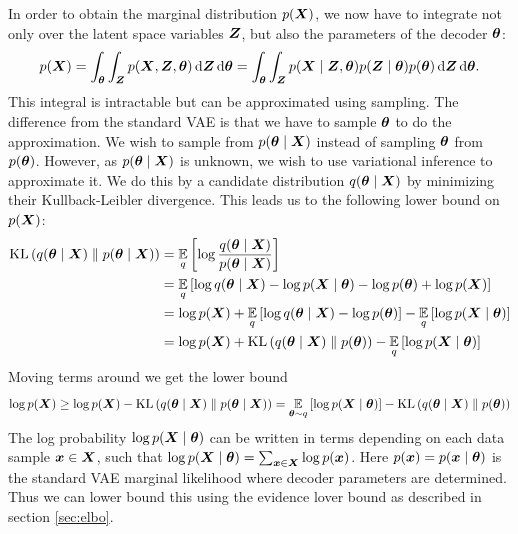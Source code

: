 In order to obtain the marginal distribution $\pX$, we now have to integrate not only over the latent space variables $\ve{Z}$, but also the parameters of the decoder $\ve{\theta}$:
\begin{equation}
    \pX = \int_{\ve{\theta}}\int_{\ve{Z}} p\prts{\ve{X}, \ve{Z}, \ve{\theta}} \diff \ve{Z} \diff \ve{\theta} = \int_{\ve{\theta}}\int_{\ve{Z}} p\prts{\ve{X} \mid \ve{Z}, \ve{\theta}} p(\ve{Z} \mid \ve{\theta}) p(\ve{\theta}) \diff \ve{Z} \diff \ve{\theta}.\label{bayes_px}
\end{equation}
This integral is intractable but can be approximated using sampling.
The difference from the standard VAE is that we have to sample $\ve{\theta}$ to do the approximation. We wish to sample from $\pthetaX$ instead of sampling $\ve{\theta}$  from $\ptheta$. However, as $\pthetaX$ is unknown, we wish to use variational inference to approximate it. We do this by a candidate distribution $\qthetaX$ by minimizing their Kullback-Leibler divergence. This leads us to the following lower bound on $\pX$:
\begin{align*}
    \kl{\qthetaX}{\pthetaX} &= \expectedvalue_q\brts{\log \frac{\qthetaX}{\pthetaX}}\\
    &= \expectedvalue_q\brts{\log \qthetaX - \log \pXtheta - \log \ptheta + \log \pX}\\
    &= \log \pX + \expectedvalue_q\brts{\log \qthetaX - \log \ptheta} - \expectedvalue_q\brts{\log \pXtheta}\\
    &= \log \pX + \kl{\qthetaX}{\ptheta} - \expectedvalue_q\brts{\log \pXtheta}
\end{align*}
Moving terms around we get the lower bound
\[\log \pX \geq \log \pX - \kl{\qthetaX}{\pthetaX} = \expectedvalue_{\ve{\theta} \sim q}\brts{\log \pXtheta} - \kl{\qthetaX}{\ptheta}\]
The log probability $\log \pXtheta$ can be written in terms depending on each data sample $\ve{x} \in \ve{X}$, such that $\log \pXtheta = \sum_{\ve{x} \in \ve{X}} \log \px$. Here $\px = p(\ve{x} \mid \ve{\theta})$ is the standard VAE marginal likelihood where decoder parameters are determined. Thus we can lower bound this using the evidence lover bound as described in section \ref{sec:elbo}.

